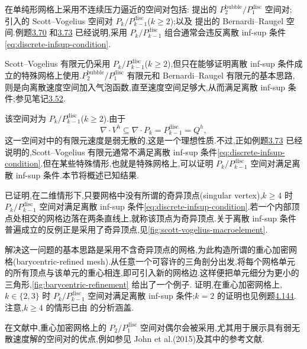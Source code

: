 \begin{note}[构造的基本思路]\label{note:discontinuous-pressure-construction}
在单纯形网格上采用不连续压力逼近的空间对包括:\textcite{CrouzeixRaviart1973} 提出的 $P_2^{\mathrm{bubble}}/P_1^{\mathrm{disc}}$ 空间对;\textcite{ScottVogelius1985} 引入的 Scott--Vogelius 空间对 $P_k/P_{k-1}^{\mathrm{disc}}$($k\ge2$);以及\textcite{BernardiRaugel1985} 提出的 Bernardi--Raugel 空间.例题\hyperref[ex:p1-p0-instability]{3.70} 和\hyperref[ex:scott-vogelius-macroelement]{3.73} 已经说明,采用 $P_k/P_{k-1}^{\mathrm{disc}}$ 组合通常会违反离散 inf-sup 条件\cref{eq:discrete-infsup-condition}.

Scott--Vogelius 有限元仍采用 $P_k/P_{k-1}^{\mathrm{disc}}$($k\ge2$),但只在能够证明离散 inf-sup 条件成立的特殊网格上使用.$P_2^{\mathrm{bubble}}/P_1^{\mathrm{disc}}$ 有限元和 Bernardi--Raugel 有限元的基本思路,则是向离散速度空间加入气泡函数,直至速度空间足够大,从而满足离散 inf-sup 条件;参见笔记\hyperref[note:infsup-not-inherited]{3.52}.
\end{note}

\begin{note}\label{note:scott-vogelius-pair}
该空间对为 $P_k/P_{k-1}^{\mathrm{disc}}$($k\ge2$).由于
\[
  \nabla\cdot V^h\subseteq \nabla\cdot P_k
      =P_{k-1}^{\mathrm{disc}}=Q^h,
\]
这一空间对中的有限元速度是弱无散的,这是一个理想性质.不过,正如例题\hyperref[ex:scott-vogelius-macroelement]{3.73} 已经说明的,Scott--Vogelius 有限元通常不满足离散 inf-sup 条件\cref{eq:discrete-infsup-condition}.但在某些特殊情形,也就是特殊网格上,可以证明 $P_k/P_{k-1}^{\mathrm{disc}}$ 空间对满足离散 inf-sup 条件.本节将概述已知结果.
\end{note}

\begin{note}\label{note:scott-vogelius-2d}
\textcite{ScottVogelius1985} 已证明,在二维情形下,只要网格中没有所谓的奇异顶点(singular vertex),$k\ge4$ 时 $P_k/P_{k-1}^{\mathrm{disc}}$ 空间对满足离散 inf-sup 条件\cref{eq:discrete-infsup-condition}.若一个内部顶点处相交的网格边落在两条直线上,就称该顶点为奇异顶点.关于离散 inf-sup 条件普遍成立的反例正是采用了奇异顶点,见\cref{fig:scott-vogelius-macroelement}.

解决这一问题的基本思路是采用不含奇异顶点的网格,为此构造所谓的重心加密网格(barycentric-refined mesh).从任意一个可容许的三角剖分出发,将每个网格单元的所有顶点与该单元的重心相连,即可引入新的网格边.这样便把单元细分为更小的三角形,\cref{fig:barycentric-refinement} 给出了一个例子.\textcite{Qin1994} 证明,在重心加密网格上,$k\in\{2,3\}$ 时 $P_k/P_{k-1}^{\mathrm{disc}}$ 空间对满足离散 inf-sup 条件;$k=2$ 的证明也见例题\hyperref[ex:barycentric-refinement-scott-vogelius]{4.144}.注意,$k\ge4$ 的情形已由\textcite{ScottVogelius1985} 的分析涵盖.

在文献中,重心加密网格上的 $P_2/P_1^{\mathrm{disc}}$ 空间对偶尔会被采用,尤其用于展示具有弱无散速度解的空间对的优点,例如参见 John et al.(2015)及其中的参考文献.
\end{note}

